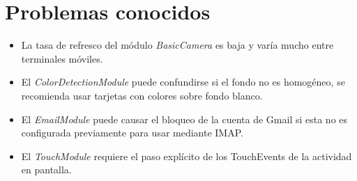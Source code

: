 \section{Problemas conocidos}
\begin{itemize}
	\item La tasa de refresco del módulo \textit{BasicCamera} es baja y varía mucho entre terminales móviles.
	\item El \textit{ColorDetectionModule} puede confundirse si el fondo no es homogéneo, se recomienda usar tarjetas con colores sobre fondo blanco.
	\item El \textit{EmailModule} puede causar el bloqueo de la cuenta de Gmail si esta no es configurada previamente para usar mediante IMAP.
	\item El \textit{TouchModule} requiere el paso explícito de los TouchEvents de la actividad en pantalla.
\end{itemize}
\label{sec:known_issues}
    

